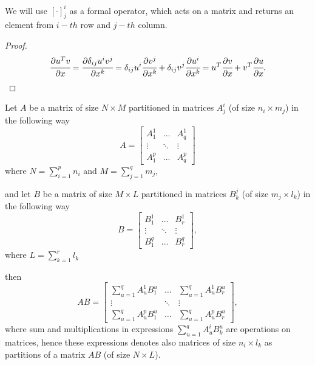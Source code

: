 \documentclass[main.tex]{subfiles}
\begin{document}
We will use $[\cdot]^i_j$ as a formal operator, which acts on a matrix and returns an element from $i-th$ row and $j-th$ column.

\begin{proof}
\begin{equation}
\cfrac{\partial u^T v}{\partial x} = \cfrac{\partial \delta_{ij}u^iv^j}{\partial x^k} = \delta_{ij}u^i \cfrac{\partial v^j}{\partial x^k} + \delta_{ij}v^j \cfrac{\partial u^i}{\partial x^k} = u^T \cfrac{\partial v}{\partial x} + v^T \cfrac{\partial u}{\partial x}.
\end{equation}
\end{proof}
\begin{theorem}
Let $A$ be a matrix of size $N \times M$ partitioned in matrices $A^i_j$ (of size $n_i \times m_j$) in the following way
\begin{equation}
A = \begin{bmatrix}
    A^1_1 &  \dots  & A^1_q \\
    \vdots &  \ddots & \vdots \\
    A^p_1 &  \dots  & A^p_q
\end{bmatrix}
\end{equation}
where $N = \sum_{i=1}^p n_i$ and  $M = \sum_{j=1}^q m_j$,

and let $B$ be a matrix of size $M\times L$ partitioned in matrices $B^j_k$ (of size $m_j \times l_k$) in the following way
\begin{equation}
B = \begin{bmatrix}
    B^1_1 &  \dots  & B^1_r \\
    \vdots &  \ddots & \vdots \\
    B^q_1 &  \dots  & B^q_r
\end{bmatrix},
\end{equation}
where $L=\sum_{k=1}^r l_k$

then
\begin{equation}
AB = \begin{bmatrix}
    \sum_{u=1}^q A^1_u B_1^u &  \dots  & \sum_{u=1}^q A^1_u B^u_r \\
    \vdots &  \ddots & \vdots \\
    \sum_{u=1}^q A^p_u B^u_1 &  \dots  & \sum_{u=1}^q A^p_u B^u_r
\end{bmatrix},
\end{equation}
where sum and multiplications in expressions $\sum_{u=1}^q A^i_u B^u_k$ are operations on matrices, hence these expressions denotes also matrices of size $n_i\times l_k$ as partitions of a matrix $AB$ (of size $N \times L$).
\end{theorem}
\end{document}
